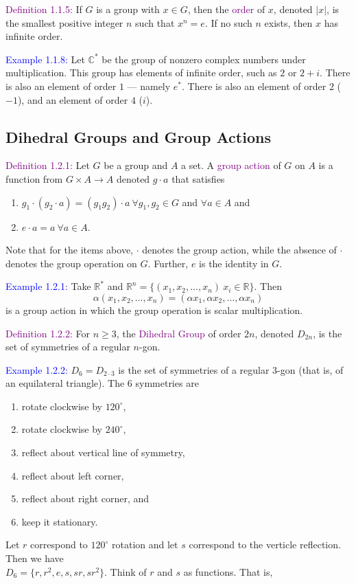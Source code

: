 \documentclass{article}
\begin{document}
\textcolor{purple}{Definition 1.1.5:} If $G$ is a group with $x \in G$, then the \textcolor{purple}{order} of $x$, denoted $|x|$, is the 
smallest positive integer $n$ such that $x^n = e$. If no such $n$ exists, then $x$ has infinite order.

\textcolor{blue}{Example 1.1.8:} Let $\mathbb{C}^*$ be the group of nonzero complex numbers under multiplication. This group has elements 
of infinite order, such as $2$ or $2 + i$. There is also an element of order $1$ --- namely $e^*$. There is also an element of order $2$ 
($-1$), and an element of order $4$ ($i$).

\subsection{Dihedral Groups and Group Actions}

\textcolor{purple}{Definition 1.2.1:} Let $G$ be a group and $A$ a set. A \textcolor{purple}{group action} of $G$ on $A$ is a function 
from $G \times A \longrightarrow A$ denoted $g \cdot a$ that satisfies
\begin{enumerate}
    \item $g_1 \cdot (g_2 \cdot a) = (g_1g_2) \cdot a \ \forall g_1, g_2 \in G$ and $\forall a \in A$ and 
    \item $e \cdot a = a \ \forall a \in A$.
\end{enumerate}
Note that for the items above, $\cdot$ denotes the group action, while the absence of $\cdot$ denotes the group operation on $G$. Further, 
$e$ is the identity in $G$.

\textcolor{blue}{Example 1.2.1:} Take $\mathbb{R}^*$ and $\mathbb{R}^n = \{(x_1, x_2, \dots, x_n)\: x_i \in \mathbb{R}\}$. Then
\[\alpha(x_1, x_2, \dots, x_n) = (\alpha x_1, \alpha x_2, \dots, \alpha x_n)\]
is a group action in which the group operation is scalar multiplication.

\textcolor{purple}{Definition 1.2.2:} For $n \geq 3$, the \textcolor{purple}{Dihedral Group} of order $2n$, denoted $D_{2n}$, is the set 
of symmetries of a regular $n$-gon.

\textcolor{blue}{Example 1.2.2:} $D_6 = D_{2 \cdot 3}$ is the set of symmetries of a regular $3$-gon (that is, of an equilateral triangle). 
The $6$ symmetries are
\begin{enumerate}
    \item rotate clockwise by $120^{\circ}$,
    \item rotate clockwise by $240^{\circ}$,
    \item reflect about vertical line of symmetry,
    \item reflect about left corner,
    \item reflect about right corner, and 
    \item keep it stationary.
\end{enumerate}
Let $r$ correspond to $120^{\circ}$ rotation and let $s$ correspond to the verticle reflection. Then we have \\
$D_6 = \{r, r^2, e, s, sr, sr^2\}$. Think of $r$ and $s$ as functions. That is, 
\end{document}
